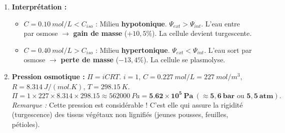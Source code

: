 \documentclass[11pt]{article}
\begin{document}
\begin{exoresolu}
\begin{enumerate}
    \[
    C_{iso} \approx \num{0,20} + \frac{\num{2,1}}{\num{2,1} + \num{5,8}} \times (\num{0,30} - \num{0,20}) = \num{0,20} + \frac{\num{2,1}}{\num{7,9}} \times \num{0,10} \approx \mathbf{\num{0,227}\ mol/L}
    \]
    (On retient \textbf{\SI{0,23}{mol/L}}).
    \item \textbf{Interprétation :}
    \begin{itemize}
        \item $C = \SI{0,10}{mol/L} < C_{iso}$ : Milieu \textbf{hypotonique}. $\Psi_{ext} > \Psi_{int}$. L'eau entre par osmose $\to$ \textbf{gain de masse} ($+10,5\%$). La cellule devient turgescente.
        \item $C = \SI{0,40}{mol/L} > C_{iso}$ : Milieu \textbf{hypertonique}. $\Psi_{ext} < \Psi_{int}$. L'eau sort par osmose $\to$ \textbf{perte de masse} ($-13,4\%$). La cellule se plasmolyse.
    \end{itemize}
    \item \textbf{Pression osmotique :} $\Pi = i C R T$.
    $i=1$, $C = \SI{0,227}{mol/L} = \SI{227}{mol/m^3}$, $R = \SI{8,314}{J/(mol.K)}$, $T = \SI{298,15}{K}$.
    \[
    \Pi = 1 \times 227 \times \num{8,314} \times \num{298,15} \approx \SI{562000}{Pa} = \mathbf{\num{5,62} \times 10^5\ Pa} \ (\approx \mathbf{5,6\ bar} \text{ ou } \mathbf{5,5\ atm}).
    \]
    \emph{Remarque :} Cette pression est considérable ! C'est elle qui assure la rigidité (turgescence) des tissus végétaux non lignifiés (jeunes pousses, feuilles, pétioles).
\end{enumerate}
\end{exoresolu}
\end{document}
